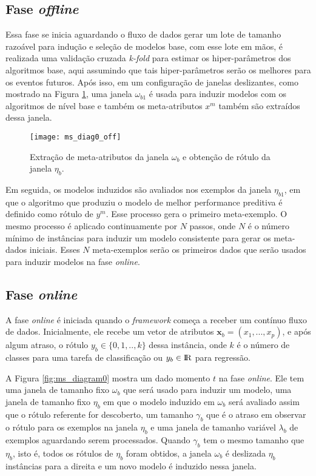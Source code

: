 \subsection{Fase \textit{offline}}
\label{subsec:offline}
Essa fase se inicia aguardando o fluxo de dados gerar um lote de tamanho
razoável para indução e seleção de modelos base, com esse lote em mãos, é
realizada uma validação cruzada \textit{k-fold} para estimar os
hiper-parâmetros dos algoritmos base, aqui assumindo que tais hiper-parâmetros
serão os melhores para os eventos futuros.
Após isso, em um configuração de janelas deslizantes, como mostrado na Figura
\ref{fig:ms_diag0_off}, uma janela $\omega_{b1}$ é usada para induzir modelos
com os algoritmos de nível base e também os meta-atributos $x^m$ também são
extraídos dessa janela.

\begin{figure}[ht]
    \centering
    \texttt{[image: ms\_diag0\_off]}
    \caption{Extração de meta-atributos da janela $\omega_b$ e obtenção de
    rótulo da janela $\eta_b$.}
    \label{fig:ms_diag0_off}
\end{figure}

Em seguida, os modelos induzidos são avaliados nos exemplos da janela
$\eta_{b1}$, em que o algoritmo que produziu o modelo de melhor performance
preditiva é definido como rótulo de $y^m$. Esse processo gera o primeiro
meta-exemplo. O mesmo processo é aplicado continuamente por $N$ passos, onde
$N$ é o número mínimo de instâncias para induzir um modelo consistente para
gerar os meta-dados iniciais. Esses $N$ meta-exemplos serão os primeiros dados
que serão usados para induzir modelos na fase \textit{online}.

\subsection{Fase \textit{online}}
\label{subsec:online}

A fase \textit{online} é iniciada quando o \textit{framework} começa a receber um contínuo fluxo de dados.
Inicialmente, ele recebe um vetor de atributos $\boldsymbol{x}_b =
(x_1,...,x_p)$, e após algum atraso, o rótulo $y_b \in \{0,1,..,k\}$
dessa instância, onde $k$ é o número de classes para uma tarefa de classificação ou $y_b \in \rm{I\!R}$ para
regressão.

A Figura \ref{fig:ms_diagram0} mostra um dado momento $t$ na fase \textit{online}. Ele
tem uma janela de tamanho fixo $\omega_b$ que será usado para induzir um
modelo, uma janela de tamanho fixo $\eta_b$ em que o modelo induzido em
$\omega_b$ será avaliado assim que o rótulo referente for descoberto, um
tamanho $\gamma_b$ que é o atraso em observar o rótulo para os exemplos na
janela $\eta_b$ e uma janela de tamanho variável $\lambda_b$ de exemplos
aguardando serem processados.
Quando $\gamma_b$ tem o mesmo tamanho que $\eta_b$, isto é, todos os rótulos de
$\eta_b$ foram obtidos, a janela $\omega_b$ é deslizada $\eta_b$ instâncias
para a direita e um novo modelo é induzido nessa janela.

